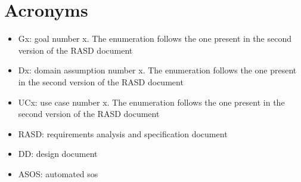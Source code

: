 \section{Acronyms}
\begin{itemize}
\item Gx: goal number x. The enumeration follows the one present in the second
version of the RASD document

\item Dx: domain assumption number x. The enumeration follows the one present in the
second version of the RASD document

\item UCx: use case number x. The enumeration follows the one present in the second
version of the RASD document

\item RASD: requirements analysis and specification document

\item DD: design document

\item ASOS: automated sos 

\end{itemize}
